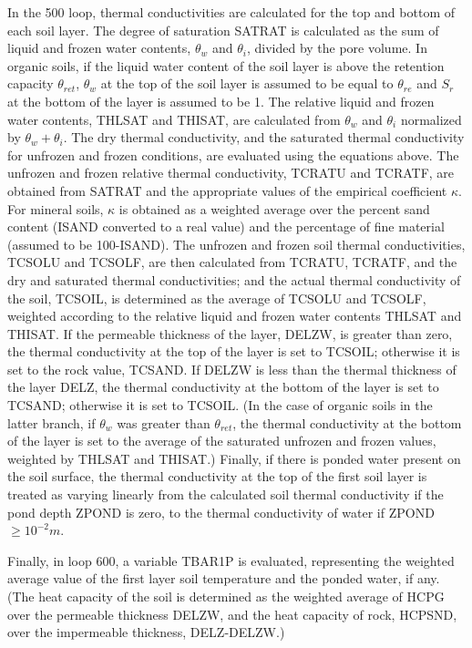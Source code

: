 In the 500 loop, thermal conductivities are calculated for the top and bottom of each soil layer. The degree of saturation S\+A\+T\+R\+A\+T is calculated as the sum of liquid and frozen water contents, $\theta_w$ and $\theta_i$, divided by the pore volume. In organic soils, if the liquid water content of the soil layer is above the retention capacity $\theta_{ret}$, $\theta_w$ at the top of the soil layer is assumed to be equal to $\theta_{re}$ and $S_r$ at the bottom of the layer is assumed to be 1. The relative liquid and frozen water contents, T\+H\+L\+S\+A\+T and T\+H\+I\+S\+A\+T, are calculated from $\theta_w$ and $\theta_i$ normalized by $\theta_w + \theta_i$. The dry thermal conductivity, and the saturated thermal conductivity for unfrozen and frozen conditions, are evaluated using the equations above. The unfrozen and frozen relative thermal conductivity, T\+C\+R\+A\+T\+U and T\+C\+R\+A\+T\+F, are obtained from S\+A\+T\+R\+A\+T and the appropriate values of the empirical coefficient $\kappa$. For mineral soils, $\kappa$ is obtained as a weighted average over the percent sand content (I\+S\+A\+N\+D converted to a real value) and the percentage of fine material (assumed to be 100-\/\+I\+S\+A\+N\+D). The unfrozen and frozen soil thermal conductivities, T\+C\+S\+O\+L\+U and T\+C\+S\+O\+L\+F, are then calculated from T\+C\+R\+A\+T\+U, T\+C\+R\+A\+T\+F, and the dry and saturated thermal conductivities; and the actual thermal conductivity of the soil, T\+C\+S\+O\+I\+L, is determined as the average of T\+C\+S\+O\+L\+U and T\+C\+S\+O\+L\+F, weighted according to the relative liquid and frozen water contents T\+H\+L\+S\+A\+T and T\+H\+I\+S\+A\+T. If the permeable thickness of the layer, D\+E\+L\+Z\+W, is greater than zero, the thermal conductivity at the top of the layer is set to T\+C\+S\+O\+I\+L; otherwise it is set to the rock value, T\+C\+S\+A\+N\+D. If D\+E\+L\+Z\+W is less than the thermal thickness of the layer D\+E\+L\+Z, the thermal conductivity at the bottom of the layer is set to T\+C\+S\+A\+N\+D; otherwise it is set to T\+C\+S\+O\+I\+L. (In the case of organic soils in the latter branch, if $\theta_w$ was greater than $\theta_{ret}$, the thermal conductivity at the bottom of the layer is set to the average of the saturated unfrozen and frozen values, weighted by T\+H\+L\+S\+A\+T and T\+H\+I\+S\+A\+T.) Finally, if there is ponded water present on the soil surface, the thermal conductivity at the top of the first soil layer is treated as varying linearly from the calculated soil thermal conductivity if the pond depth Z\+P\+O\+N\+D is zero, to the thermal conductivity of water if Z\+P\+O\+N\+D $\geq 10^{-2} m$.

Finally, in loop 600, a variable T\+B\+A\+R1\+P is evaluated, representing the weighted average value of the first layer soil temperature and the ponded water, if any. (The heat capacity of the soil is determined as the weighted average of H\+C\+P\+G over the permeable thickness D\+E\+L\+Z\+W, and the heat capacity of rock, H\+C\+P\+S\+N\+D, over the impermeable thickness, D\+E\+L\+Z-\/\+D\+E\+L\+Z\+W.)